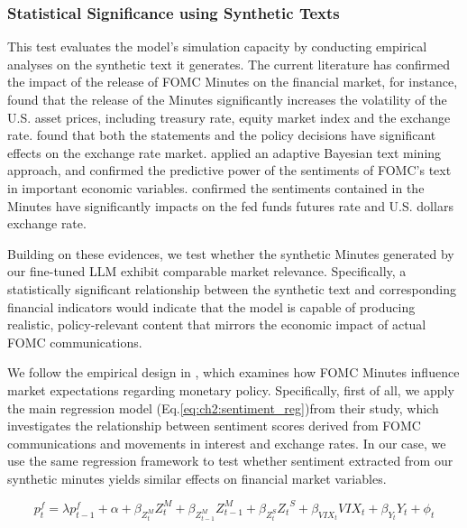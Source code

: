 
\subsubsection*{Statistical Significance using Synthetic Texts}


This test evaluates the model’s simulation capacity by conducting empirical analyses on the synthetic text it generates. The current literature has confirmed the impact of the release of FOMC Minutes on the financial market, for instance, \cite{rosa2013financial} found that the release of the Minutes significantly increases the volatility of the U.S. asset prices, including treasury rate, equity market index and the exchange rate. \cite{rosa2011high} found that both the statements and the policy decisions have significant effects on the exchange rate market. \cite{huang2021economic} applied an adaptive Bayesian text mining approach, and confirmed the predictive power of the sentiments of FOMC's text in important economic variables. \cite{tadle2022fomc} confirmed the sentiments contained in the Minutes have significantly impacts on the fed funds futures rate and U.S. dollars exchange rate. 


Building on these evidences, we test whether the synthetic Minutes generated by our fine-tuned LLM exhibit comparable market relevance. Specifically, a statistically significant relationship between the synthetic text and corresponding financial indicators would indicate that the model is capable of producing realistic, policy-relevant content that mirrors the economic impact of actual FOMC communications.



We follow the empirical design in \cite{tadle2022fomc}, which examines how FOMC Minutes influence market expectations regarding monetary policy. Specifically, first of all, we apply the main regression model (Eq.\ref{eq:ch2:sentiment_reg})from their study, which investigates the relationship between sentiment scores derived from FOMC communications and movements in interest and exchange rates. In our case, we use the same regression framework to test whether sentiment extracted from our synthetic minutes yields similar effects on financial market variables.



\begin{equation}\label{eq:ch2:sentiment_reg}
    p^f_t = \lambda p^f_{t-1} + \alpha + \beta_{Z_t^M} Z_t^M+ \beta_{Z_{t-1}^M} Z_{t-1}^M + \beta_{Z_t^S} {Z_t}^S + \beta_{VIX_t}VIX_t + \beta_{Y_t}Y_t + \phi_t 
\end{equation}



